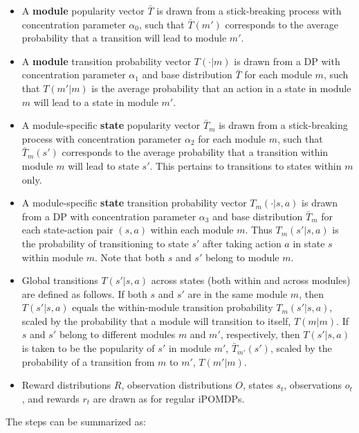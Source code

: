\documentclass[11pt]{article}
\begin{document}
\begin{itemize}
\item A \textbf{module} popularity vector $\bar{T}$ is drawn from a stick-breaking process with concentration parameter $\alpha_0$, such that $\bar{T}(m')$ corresponds to the average probability that a transition will lead to module $m'$.
\item A \textbf{module} transition probability vector $T(\cdot | m)$ is drawn from a DP with concentration parameter $\alpha_1$ and base distribution $\bar{T}$ for each module $m$, such that $T(m'|m)$ is the average probability that an action in a state in module $m$ will lead to a state in module $m'$.
\item A module-specific \textbf{state} popularity vector $\bar{T}_{m}$ is drawn from a stick-breaking process with concentration parameter $\alpha_2$ for each module $m$, such that $\bar{T}_m(s')$ corresponds to the average probability that a transition within module $m$ will lead to state $s'$. This pertains to transitions to states within $m$ only.
\item A module-specific \textbf{state} transition probability vector $T_m(\cdot|s,a)$ is drawn from a DP with concentration parameter $\alpha_3$ and base distribution $\bar{T}_{m}$ for each state-action pair $(s,a)$ within each module $m$. Thus $T_m(s'|s,a)$ is the probability of transitioning to state $s'$ after taking action $a$ in state $s$ within module $m$. Note that both $s$ and $s'$ belong to module $m$.
\item Global transitions $T(s'|s,a)$ across states (both within and across modules) are defined as follows. If both $s$ and $s'$ are in the same module $m$, then $T(s'|s,a)$ equals the within-module transition probability $T_m(s'|s,a)$, scaled by the probability that a module will transition to itself, $T(m|m)$. If $s$ and $s'$ belong to different modules $m$ and $m'$, respectively, then $T(s'|s,a)$ is taken to be the popularity of $s'$ in module $m'$, $\bar{T}_{m'}(s')$, scaled by the probability of a transition from $m$ to $m'$, $T(m'|m)$.
\item Reward distributions $R$, observation distributions $O$, states $s_t$, observations $o_t$, and rewards $r_t$ are drawn as for regular iPOMDPs.
\end{itemize}

The steps can be summarized as:
\end{document}
